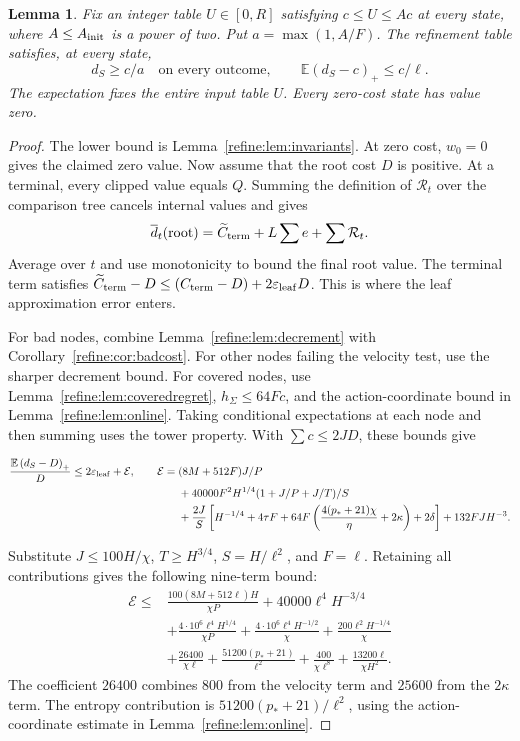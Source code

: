 \documentclass[11pt]{article}
\newtheorem{lemma}[theorem]{Lemma}
\theoremstyle{definition}
\newcommand{\E}{\mathbb E}
\newcommand{\pos}[1]{\left(#1\right)_+}
\newcommand{\1}{\mathbf 1}
\begin{document}
\begin{lemma}\label{refine:lem:accuracy}
Fix an integer table $U\in[0,R]$ satisfying $c\le U\le Ac$ at every
state, where $A\le A_{\rm init}$ is a power of two.
Put $a=\max(1,A/F)$.
The refinement table satisfies, at every state,
\[
 d_S\ge c/a\quad\text{on every outcome},\qquad
 \E\pos{d_S-c}\le c/\ell.
\]
The expectation fixes the entire input table $U$.
Every zero-cost state has value zero.
\end{lemma}
\begin{proof}

The lower bound is Lemma~\ref{refine:lem:invariants}.
At zero cost, $w_0=0$ gives the claimed zero value.
Now assume that the root cost $D$ is positive.
At a terminal, every clipped value equals $Q$.
Summing the definition of $\mathcal R_t$ over the comparison tree
cancels internal values and gives
\[
 \overline d_t({\rm root})=\widetilde C_{\rm term}+L\sum e+\sum\mathcal R_t.
\]
Average over $t$ and use monotonicity to bound the final root value.
The terminal term satisfies
$\widetilde C_{\rm term}-D\le(C_{\rm term}-D)+2\varepsilon_{\rm leaf}D$.
This is where the leaf approximation error enters.

For bad nodes, combine Lemma~\ref{refine:lem:decrement} with
Corollary~\ref{refine:cor:badcost}.
For other nodes failing the velocity test, use the sharper decrement bound.
For covered nodes, use Lemma~\ref{refine:lem:coveredregret},
$h_\Sigma\le64Fc$, and the action-coordinate bound in
Lemma~\ref{refine:lem:online}.
Taking conditional expectations at each node and then summing uses the
tower property. With $\sum c\le2JD$, these bounds give
{\small
\begin{align*}
 \frac{\E\pos{d_S-D}}D\le 2\varepsilon_{\rm leaf}+\mathcal E,\qquad
 \mathcal E={}&(8M+512F)J/P\\
 &+40000F^2H^{1/4}(1+J/P+J/T)/S\\
 &+\frac{2J}{S}\left[H^{-1/4}+4\tau F+
 64F\left(\frac{4(p_*+21)\chi}{\eta}+2\kappa\right)+2\delta\right]
 +132FJH^{-3}.
\end{align*}
\par}
Substitute $J\le100H/\chi$, $T\ge H^{3/4}$, $S=H/\ell^2$, and $F=\ell$.
Retaining all contributions gives the following nine-term bound:
\begin{align*}
 \mathcal E\le{}&\frac{100(8M+512\ell)H}{\chi P}
 +40000\ell^4H^{-3/4}\\
 &+\frac{4\cdot10^6\ell^4H^{1/4}}{\chi P}
 +\frac{4\cdot10^6\ell^4H^{-1/2}}{\chi}
 +\frac{200\ell^2H^{-1/4}}\chi\\
 &+\frac{26400}{\chi\ell}
 +\frac{51200(p_*+21)}{\ell^2}
 +\frac{400}{\chi\ell^8}
 +\frac{13200\ell}{\chi H^2}.
\end{align*}
The coefficient $26400$ combines $800$ from the velocity term and $25600$
from the $2\kappa$ term. The entropy contribution is
$51200(p_*+21)/\ell^2$, using the action-coordinate estimate in
Lemma~\ref{refine:lem:online}.


\end{proof}
\end{document}
